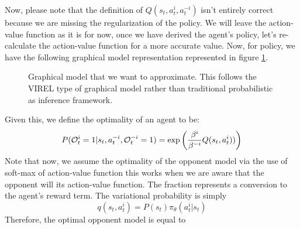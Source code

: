 Now, please note that the definition of $Q(s_t, a^i_t, a^{-i}_t)$ isn't entirely correct because we are missing the regularization of the policy. We will leave the action-value function as it is for now, once we have derived the agent's policy, let's re-calculate the action-value function for a more accurate value. Now, for policy, we have the following graphical model representation represented in figure \ref{fig:chap3-balancing-Q-agent}.
\begin{figure}[ht]
    \begin{minipage}[t]{0.5\linewidth}
    \centering
    \end{minipage}%
    \begin{minipage}[t]{0.5\linewidth}
    \caption{Graphical model that we want to approximate. This follows the VIREL \cite{fellows2019virel} type of graphical model rather than traditional probabilistic as inference framework.}
    \label{fig:chap3-balancing-Q-agent}
    \end{minipage}
\end{figure}
Given this, we define the optimality of an agent to be:
\begin{equation}
    P(\mathcal{O}^{i}_t = 1 | s_t, a^{-i}_t, \mathcal{O}^{-i}_t = 1) = \exp \left(  \frac{\beta^{i}}{\beta^{-i}} Q(s_t, a^{i}_t))   \right)
\end{equation}
Note that now, we assume the optimality of the opponent model via the use of soft-max of action-value function this works when we are aware that the opponent will  its action-value function. The fraction represents a conversion to the agent's reward term. The variational probability is simply 
\begin{equation}
    q(s_t, a^{i}_t) = P(s_t) \pi_\theta(a^{i}_t | s_t)
\end{equation}
Therefore, the optimal opponent model is equal to 
